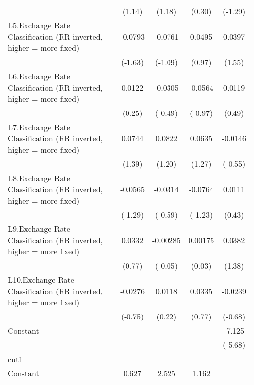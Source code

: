 {\begin{longtable}{l*{4}{c}}
                &   (1.14)         &   (1.18)         &   (0.30)         &  (-1.29)         \\
[1em]
L5.Exchange Rate Classification (RR inverted, higher = more fixed)&  -0.0793         &  -0.0761         &   0.0495         &   0.0397         \\
                &  (-1.63)         &  (-1.09)         &   (0.97)         &   (1.55)         \\
[1em]
L6.Exchange Rate Classification (RR inverted, higher = more fixed)&   0.0122         &  -0.0305         &  -0.0564         &   0.0119         \\
                &   (0.25)         &  (-0.49)         &  (-0.97)         &   (0.49)         \\
[1em]
L7.Exchange Rate Classification (RR inverted, higher = more fixed)&   0.0744         &   0.0822         &   0.0635         &  -0.0146         \\
                &   (1.39)         &   (1.20)         &   (1.27)         &  (-0.55)         \\
[1em]
L8.Exchange Rate Classification (RR inverted, higher = more fixed)&  -0.0565         &  -0.0314         &  -0.0764         &   0.0111         \\
                &  (-1.29)         &  (-0.59)         &  (-1.23)         &   (0.43)         \\
[1em]
L9.Exchange Rate Classification (RR inverted, higher = more fixed)&   0.0332         & -0.00285         &  0.00175         &   0.0382         \\
                &   (0.77)         &  (-0.05)         &   (0.03)         &   (1.38)         \\
[1em]
L10.Exchange Rate Classification (RR inverted, higher = more fixed)&  -0.0276         &   0.0118         &   0.0335         &  -0.0239         \\
                &  (-0.75)         &   (0.22)         &   (0.77)         &  (-0.68)         \\
[1em]
Constant        &                  &                  &                  &   -7.125\sym{***}\\
                &                  &                  &                  &  (-5.68)         \\
\hline
cut1            &                  &                  &                  &                  \\
Constant        &    0.627\sym{*}  &    2.525\sym{***}&    1.162\sym{***}&                  \\

\end{longtable}}
